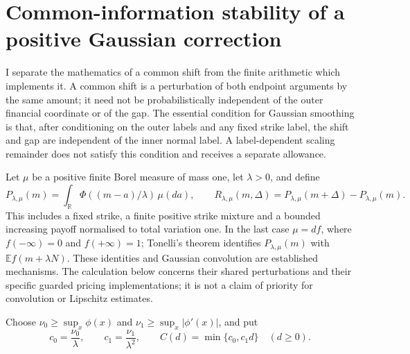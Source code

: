 \section{Common-information stability of a positive Gaussian correction}
\label{sec:common-information-stability}

I separate the mathematics of a common shift from the finite arithmetic
which implements it. A common shift is a perturbation of both endpoint
arguments by the same amount; it need not be probabilistically independent
of the outer financial coordinate or of the gap. The essential condition
for Gaussian smoothing is that, after conditioning on the outer labels
and any fixed strike label, the shift and gap are independent of the
inner normal label. A label-dependent scaling remainder does not satisfy
this condition and receives a separate allowance.

Let $\mu$ be a positive finite Borel measure of mass one, let $\lambda>0$,
and define
\begin{equation}
 P_{\lambda,\mu}(m)=\int_{\mathbb R}
       \Phi((m-a)/\lambda)\,\mu(da),\qquad
 R_{\lambda,\mu}(m,\Delta)=P_{\lambda,\mu}(m+\Delta)
                              -P_{\lambda,\mu}(m).
 \label{eq:common-information-definition}
\end{equation}
This includes a fixed strike, a finite positive strike mixture and a
bounded increasing payoff normalised to total variation one. In the last
case $\mu=df$, where $f(-\infty)=0$ and $f(+\infty)=1$; Tonelli's theorem
identifies $P_{\lambda,\mu}(m)$ with $\mathbb E f(m+\lambda N)$.
These identities and Gaussian convolution are established mechanisms.
The calculation below concerns their shared perturbations and their
specific guarded pricing implementations; it is not a claim of priority
for convolution or Lipschitz estimates.

Choose $\nu_0\geq\sup_x\phi(x)$ and
$\nu_1\geq\sup_x|\phi'(x)|$, and put
\begin{equation}
 c_0=\frac{\nu_0}{\lambda},\qquad
 c_1=\frac{\nu_1}{\lambda^2},\qquad
 C(d)=\min\{c_0,c_1d\}\quad(d\geq0).
 \label{eq:common-information-constants}
\end{equation}

